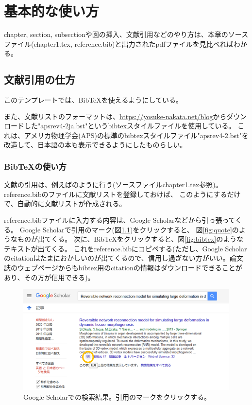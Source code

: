 \chapter{基本的な使い方}
chapter, section, subsectionや図の挿入、文献引用などのやり方は、本章のソースファイル(chapter1.tex, reference.bib)と出力されたpdfファイルを見比べればわかる。
\section{文献引用の仕方}
このテンプレートでは、BibTeXを使えるようにしている。

また、文献リストのフォーマットは、\url{https://yosuke-nakata.net/blog}からダウンロードした"apsrev4-2ja.bst"というbibtexスタイルファイルを使用している。
これは、アメリカ物理学会(APS)の標準のbibtexスタイルファイル"apsrev4-2.bst"を改造して、日本語の本も表示できるようにしたものらしい。
\subsection{BibTeXの使い方}
文献の引用は、例えば\cite{Okuda2013a}のように行う(ソースファイルchapter1.tex参照)。
reference.bibのファイルに文献リストを登録しておけば、
このようにするだけで、自動的に文献リストが作成される。

reference.bibファイルに入力する内容は、Google Scholarなどから引っ張ってくる。
Google Scholarで引用のマーク(図\ref{fig:googleScholar})をクリックすると、
図\ref{fig:quote}のようなものが出てくる。
次に、BibTeXをクリックすると、図\ref{fig:bibtex}のようなテキストが出てくる。
これをreference.bibにコピペする(ただし、Google Scholarのcitationはたまにおかしいのが出てくるので、信用し過ぎない方がいい。論文誌のウェブページからもbibtex用のcitationの情報はダウンロードできることがあり、その方が信用できる)。

\begin{figure}[htbp]
	\centering
	\includegraphics[width=12cm,clip]{fig/googleScholar.png}
	\caption{Google Scholarでの検索結果。引用のマークをクリックする。}
	\label{fig:googleScholar}
\end{figure}

